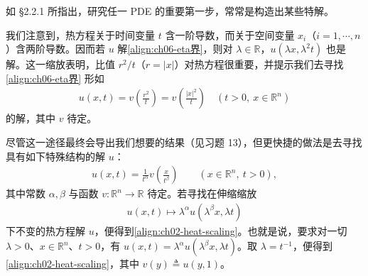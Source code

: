 \documentclass[../../main.tex]{subfiles}
\begin{document}
如 \S2.2.1 所指出，研究任一 PDE 的重要第一步，常常是构造出某些特解。

我们注意到，热方程关于时间变量 $t$ 含一阶导数，而关于空间变量 $x_i$（$i=1,\cdots,n$）含两阶导数。因而若 $u$ 解\eqref{align:ch06-eta界}，则对 $\lambda\in\mathbb{R}$，$u(\lambda x,\lambda^2 t)$ 也是解。这一缩放表明，比值 $r^2/t$（$r=|x|$）对热方程很重要，并提示我们去寻找\eqref{align:ch06-eta界} 形如
\begin{align*}
u(x,t)=v\!\left(\frac{r^2}{t}\right)=v\!\left(\frac{|x|^2}{t}\right)\quad (t>0,\ x\in\mathbb{R}^n)
\end{align*}
的解，其中 $v$ 待定。

尽管这一途径最终会导出我们想要的结果（见习题 13），但更快捷的做法是去寻找具有如下特殊结构的解 $u$：
\begin{align}\label{align:ch02-heat-scaling}
u(x,t)=\frac{1}{t^\alpha}v\!\left(\frac{x}{t^\beta}\right)\qquad (x\in\mathbb{R}^n,\ t>0),
\end{align}
其中常数 $\alpha,\beta$ 与函数 $v:\mathbb{R}^n\to\mathbb{R}$ 待定。若寻找在伸缩缩放
\begin{align*}
u(x,t)\mapsto\lambda^\alpha u(\lambda^\beta x,\lambda t)
\end{align*}
下不变的热方程解 $u$，便得到\eqref{align:ch02-heat-scaling}。也就是说，要求对一切 $\lambda>0$、$x\in\mathbb{R}^n$、$t>0$，有 $u(x,t)=\lambda^\alpha u(\lambda^\beta x,\lambda t)$。取 $\lambda=t^{-1}$，便得到\eqref{align:ch02-heat-scaling}，其中 $v(y)\triangleq u(y,1)$。
\end{document}
